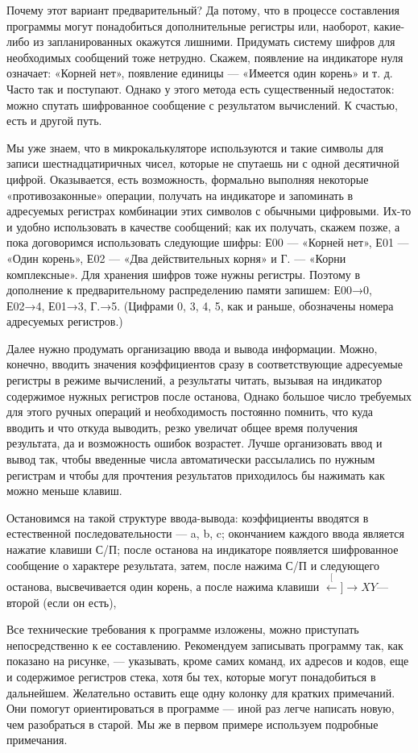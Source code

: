\documentclass[11pt,a4paper,oneside]{article}
\def\XY{$\stackrel[\leftarrow]{\rightarrow}{XY}$}
\begin{document}
Почему этот вариант предварительный? Да потому, что в процессе составления программы могут понадобиться дополнительные регистры или, наоборот, какие-либо из запланированных окажутся лишними.
Придумать систему шифров для необходимых сообщений тоже нетрудно. Скажем, появление на индикаторе нуля означает: «Корней нет», появление единицы — «Имеется один корень» и т. д. Часто так и поступают. Однако у этого метода есть существенный недостаток: можно спутать шифрованное сообщение с результатом вычислений. К счастью, есть и другой путь.

Мы уже знаем, что в микрокалькуляторе используются и такие символы для записи шестнадцатиричных чисел, которые не спутаешь ни с одной десятичной цифрой. Оказывается, есть возможность, формально выполняя некоторые «противозаконные» операции, получать на индикаторе и запоминать в адресуемых регистрах комбинации этих символов с обычными цифровыми. Их-то и удобно использовать в качестве сообщений; как их получать, скажем позже, а пока договоримся использовать следующие шифры: Е00	— «Корней нет», Е01 — «Один корень», Е02 — «Два действительных корня» и Г. — «Корни комплексные». Для хранения шифров тоже нужны регистры. Поэтому в дополнение к предварительному распределению памяти запишем: Е00→0, Е02→4, Е01→3, Г.→5. (Цифрами 0, 3, 4, 5, как и раньше, обозначены номера адресуемых регистров.)

Далее нужно продумать организацию ввода и вывода информации. Можно, конечно, вводить значения коэффициентов сразу в соответствующие адресуемые регистры в режиме вычислений, а результаты читать, вызывая на индикатор содержимое нужных регистров после останова, Однако большое число требуемых для этого ручных операций и необходимость постоянно помнить, что куда вводить и что откуда выводить, резко увеличат общее время получения результата, да и возможность ошибок возрастет. Лучше организовать ввод и вывод так, чтобы введенные числа автоматически рассылались по нужным регистрам и чтобы для прочтения результатов приходилось бы нажимать как можно меньше клавиш.

Остановимся на такой структуре ввода-вывода: коэффициенты вводятся в естественной последовательности — a, b, c; окончанием каждого ввода является нажатие клавиши С/П; после останова на индикаторе появляется шифрованное сообщение о характере результата, затем, после нажима С/П и следующего останова, высвечивается один корень, а после нажима клавиши \XY — второй (если он есть),

Все технические требования к программе изложены, можно приступать непосредственно к ее составлению. Рекомендуем записывать программу так, как показано на рисунке, — указывать, кроме самих команд, их адресов и кодов, еще и содержимое регистров стека, хотя бы тех, которые могут понадобиться в дальнейшем. Желательно оставить еще одну колонку для кратких примечаний. Они помогут ориентироваться в программе — иной раз легче написать новую, чем разобраться в старой. Мы же в первом примере используем подробные примечания.
\end{document}
